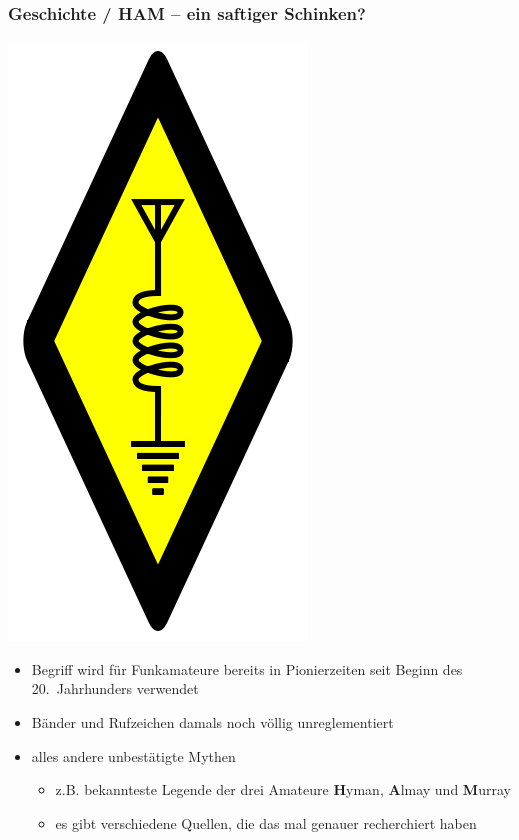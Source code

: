 \begin{frame}
    \frametitle{Geschichte / HAM -- ein saftiger Schinken?}

    \begin{center}
        \includegraphics[height=0.3\textheight]{bv01/International_amateur_radio_symbol.png}
        \tiny \hyperlink{refs}{\cite{wc}}
    \end{center}

    \begin{itemize}
        \item Begriff wird für Funkamateure bereits in Pionierzeiten seit Beginn
              des 20.~Jahrhunders verwendet
        \item Bänder und Rufzeichen damals noch völlig unreglementiert
        \item alles andere unbestätigte Mythen
        \begin{itemize}
            \item z.B. bekannteste Legende der drei Amateure \textbf{H}yman,
                  \textbf{A}lmay und \textbf{M}urray
            \item es gibt verschiedene Quellen\hyperlink{refs}{\cite{ham}},
                  die das mal genauer recherchiert haben
        \end{itemize}
    \end{itemize}

\end{frame}

